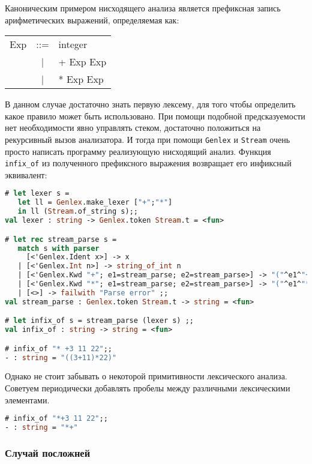 Каноническим примером нисходящего анализа является префиксная запись
арифметических выражений, определяемая как:

\begin{center}
	\begin{tabular}{rcl}
		Exp & ::= & integer \\
		& | & + Exp Exp \\
		& | & * Exp Exp \\
	\end{tabular}
\end{center}

В данном случае достаточно знать первую лексему, для того чтобы определить какое
правило может быть использовано. При помощи подобной предсказуемости нет
необходимости явно управлять стеком, достаточно положиться на рекурсивный вызов
анализатора. И тогда при помощи \texttt{Genlex} и \texttt{Stream} очень просто
написать программу реализующую нисходящий анализ. Функция \texttt{infix\_of} из
полученного префиксного выражения возвращает его инфиксный эквивалент:

\begin{lstlisting}[language=OCaml]
# let lexer s =
   let ll = Genlex.make_lexer ["+";"*"]
   in ll (Stream.of_string s);;
val lexer : string -> Genlex.token Stream.t = <fun>

# let rec stream_parse s =
   match s with parser
     [<'Genlex.Ident x>] -> x
   | [<'Genlex.Int n>] -> string_of_int n
   | [<'Genlex.Kwd "+"; e1=stream_parse; e2=stream_parse>] -> "("^e1^"+"^e2^")"
   | [<'Genlex.Kwd "*"; e1=stream_parse; e2=stream_parse>] -> "("^e1^"*"^e2^")"
   | [<>] -> failwith "Parse error" ;;
val stream_parse : Genlex.token Stream.t -> string = <fun>

# let infix_of s = stream_parse (lexer s) ;;
val infix_of : string -> string = <fun>

# infix_of "* +3 11 22";;
- : string = "((3+11)*22)"
\end{lstlisting}

Однако не стоит забывать о некоторой примитивности лексического анализа.
Советуем периодически добавлять пробелы между различными лексическими
элементами.

\begin{lstlisting}[language=OCaml]
# infix_of "*+3 11 22";;
- : string = "*+"
\end{lstlisting}

\subsubsection{Случай посложней}

